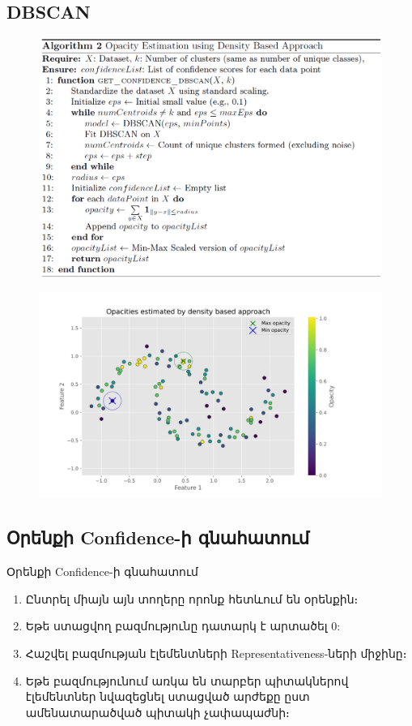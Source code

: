 \documentclass[aspectratio=169]{beamer}
\begin{document}
\subsection{{\rm DBSCAN}}
\begin{frame}
\begin{figure}
    \centering
    \includegraphics[width=0.75\linewidth]{alg_dbscan_opacity.png}
    \label{fig:enter-label}
\end{figure}
    
\end{frame}


\begin{frame}
\begin{figure}
    \centering
    \includegraphics[width=0.75\linewidth]{denisty_opactiy.png}
    \label{fig:enter-label}
\end{figure}
\end{frame}

\subsection{Օրենքի {\rm Confidence}-ի գնահատում}
\begin{frame}{Օրենքի {\rm Confidence}-ի գնահատում}

\begin{enumerate}
    \item Ընտրել միայն այն տողերը որոնք հետևում են օրենքին։ \pause
    \item Եթե ստացվող բազմությունը դատարկ է արտածել 0: \pause
    \item Հաշվել բազմության էլեմենտների {\rm Representativeness}-ների միջինը։ \pause
    \item Եթե բազմությունում առկա են տարբեր պիտակներով էլեմենտներ նվազեցնել ստացված արժեքը ըստ ամենատարածված պիտակի չափապաժնի։
\end{enumerate} 
\end{frame}
\end{document}
